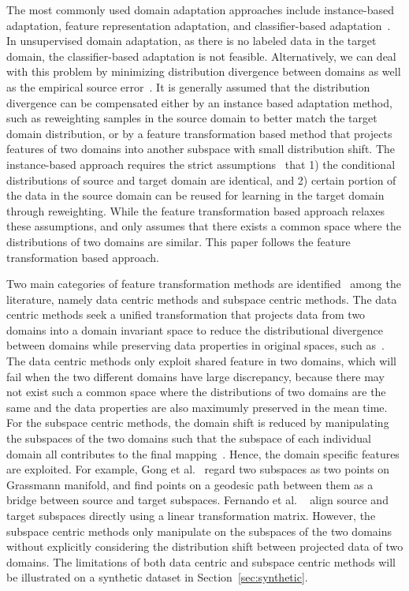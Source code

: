 \documentclass[10pt,twocolumn,letterpaper]{article}
\begin{document}
The most commonly used domain adaptation approaches include instance-based adaptation, feature representation adaptation, and classifier-based adaptation~\cite{Pan2010,Shao2015}.
In unsupervised domain adaptation, as there is no labeled data in the target domain, the classifier-based adaptation is not feasible. Alternatively, we can deal with this problem by minimizing distribution divergence between domains as well as the empirical source error~\cite{Ben-David2010}.
It is generally assumed that the distribution divergence can be compensated either by an instance based adaptation method, such as reweighting samples in the source domain to better match the target domain distribution, or by a feature transformation based method that projects features of two domains into another subspace with small distribution shift. The instance-based approach requires the strict assumptions~\cite{Pan2010,Margolis2011} that 1) the conditional distributions of source and target domain are identical, and 2) certain portion of the data in the source domain can be reused for learning in the target domain through reweighting.
While the feature transformation based approach relaxes these assumptions, and only assumes that there exists a common space where the distributions of two domains are similar. This paper follows the feature transformation based approach.


Two main categories of feature transformation methods are identified~\cite{Yang2015} among the literature, namely data centric methods and subspace centric methods. The data centric methods seek a unified transformation that projects data from two domains into a domain invariant space to reduce the distributional divergence between domains while preserving data properties in original spaces, such as~\cite{Pan2011,Long2013,Long2014,Ghifary2016}. The data centric methods only exploit shared feature in two domains, which will fail when the two different domains have large discrepancy, because there may not exist such a common space where the distributions of two domains are the same and the data properties are also maximumly preserved in the mean time. For the subspace centric methods, the domain shift is reduced by manipulating the subspaces of the two domains such that the subspace of each individual domain all contributes to the final mapping~\cite{Gong2012,Fernando2013,Fernando2015}. Hence, the domain specific features are exploited. For example, Gong et al.~\cite{Gong2012} regard two subspaces as two points on Grassmann manifold, and find points on a geodesic path between them as a bridge between source and target subspaces. Fernando et al. ~\cite{Fernando2013} align source and target subspaces directly using a linear transformation matrix. However, the subspace centric methods only manipulate on the subspaces of the two domains without explicitly considering the distribution shift between projected data of two domains. The limitations of both data centric and subspace centric methods will be illustrated on a synthetic dataset in Section~\ref{sec:synthetic}.
\end{document}

